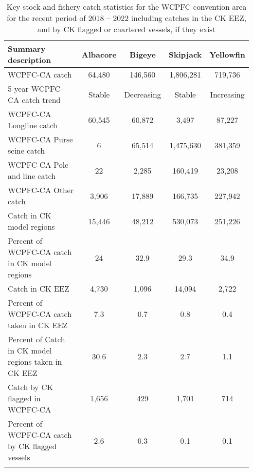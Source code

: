 \begin{longtable}{lcccc}
\caption{Key stock and fishery catch statistics for the WCPFC convention area for the recent period of 2018 -- 2022 including catches in the CK EEZ, and by CK flagged or chartered vessels, if they exist} \\ 
  \hline
Summary description & Albacore & Bigeye & Skipjack & Yellowfin \\ 
  \hline
WCPFC-CA catch & 64,480 & 146,560 & 1,806,281 & 719,736 \\ 
  5-year WCPFC-CA catch trend & Stable & Decreasing & Stable & Increasing \\ 
  WCPFC-CA Longline catch & 60,545 & 60,872 & 3,497 & 87,227 \\ 
  WCPFC-CA Purse seine catch & 6 & 65,514 & 1,475,630 & 381,359 \\ 
  WCPFC-CA Pole and line catch & 22 & 2,285 & 160,419 & 23,208 \\ 
  WCPFC-CA Other catch & 3,906 & 17,889 & 166,735 & 227,942 \\ 
  Catch in CK model regions & 15,446 & 48,212 & 530,073 & 251,226 \\ 
  Percent of WCPFC-CA catch in CK model regions & 24 & 32.9 & 29.3 & 34.9 \\ 
   \hline
Catch in CK EEZ & 4,730 & 1,096 & 14,094 & 2,722 \\ 
  Percent of WCPFC-CA catch taken in CK EEZ & 7.3 & 0.7 & 0.8 & 0.4 \\ 
  Percent of Catch in CK model regions taken in CK EEZ & 30.6 & 2.3 & 2.7 & 1.1 \\ 
  Catch by CK flagged in WCPFC-CA & 1,656 & 429 & 1,701 & 714 \\ 
  Percent of WCPFC-CA catch by CK flagged vessels & 2.6 & 0.3 & 0.1 & 0.1 \\ 
  \hline
\label{cat_sum_tab}
\end{longtable}
